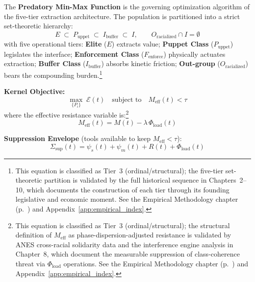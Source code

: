\begin{definition}
The \textbf{Predatory Min-Max Function} is the governing optimization algorithm of the five-tier extraction architecture. The population is partitioned into a strict set-theoretic hierarchy:
\begin{equation}\label{eq:10.4-predatory-minmax-full-definition}
E \;\subset\; P_{\text{uppet}} \;\subset\; I_{\text{buffer}} \;\subset\; I, \qquad O_{\text{racialized}} \cap I = \emptyset
\end{equation}
with five operational tiers: \textbf{Elite} ($E$) extracts value; \textbf{Puppet Class} ($P_{\text{uppet}}$) legislates the interface; \textbf{Enforcement Class} ($F_{\text{enforce}}$) physically actuates extraction; \textbf{Buffer Class} ($I_{\text{buffer}}$) absorbs kinetic friction; \textbf{Out-group} ($O_{\text{racialized}}$) bears the compounding burden.\footnote{This equation is classified as Tier~3 (ordinal/structural); the five-tier set-theoretic partition is validated by the full historical sequence in Chapters~2--10, which documents the construction of each tier through its founding legislative and economic moment. See the Empirical Methodology chapter (p.~\pageref{ch:empirical_methodology}) and Appendix~\ref{app:empirical_index}.}

\textbf{Kernel Objective:}
\begin{equation}\label{eq:10.5-kernel-objective-canonical}
\max_{\{P_i\}}\; \mathcal{E}(t) \quad \text{subject to} \quad M_{\text{eff}}(t) < \tau
\end{equation}
where the effective resistance variable is:\footnote{This equation is classified as Tier~3 (ordinal/structural); the structural definition of $M_{\text{eff}}$ as phase-dispersion-adjusted resistance is validated by ANES cross-racial solidarity data and the interference engine analysis in Chapter~8, which document the measurable suppression of class-coherence threat via $\Phi_{\text{load}}$ operations. See the Empirical Methodology chapter (p.~\pageref{ch:empirical_methodology}) and Appendix~\ref{app:empirical_index}.}
\begin{equation}\label{eq:10.6-effective-resistance-variable}
M_{\text{eff}}(t) = M(t) - \lambda\,\Phi_{\text{load}}(t)
\end{equation}

\textbf{Suppression Envelope} (tools available to keep $M_{\text{eff}} < \tau$):
\begin{equation}\label{eq:10.7-suppression-envelope-canonical}
\Sigma_{\text{sup}}(t) = \psi_s(t) + \psi_m(t) + R(t) + \Phi_{\text{load}}(t)
\end{equation}


\end{definition}
